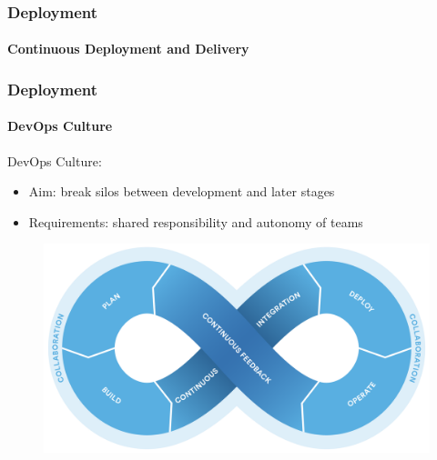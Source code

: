 \documentclass{beamer}
\begin{document}

\begin{frame}
	\frametitle{Deployment}
	\framesubtitle{Continuous Deployment and Delivery}

\end{frame}

\begin{frame}
	\frametitle{Deployment}
	\framesubtitle{DevOps Culture}

DevOps Culture:
	\begin{itemize}
		\item Aim: break silos between development and later stages 
		\item Requirements: shared responsibility and autonomy of teams
	\end{itemize}
	\begin{figure}
		\begin{center}
 			\includegraphics[scale=0.12]{devopsloop}
		\end{center}
	\end{figure}

\end{frame}
\end{document}
